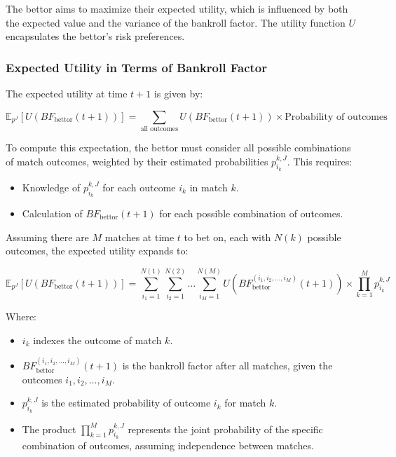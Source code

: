 The bettor aims to maximize their expected utility, which is influenced by both the expected value and the variance of the bankroll factor. The utility function \( U \) encapsulates the bettor's risk preferences.

\subsubsection{Expected Utility in Terms of Bankroll Factor}

The expected utility at time \( t+1 \) is given by:

\[
\mathbb{E}_{p^{J}}\left[ U\left( BF_{\text{bettor}}(t+1) \right) \right] = \sum_{\text{all outcomes}} U\left( BF_{\text{bettor}}(t+1) \right) \times \text{Probability of outcomes}
\]

To compute this expectation, the bettor must consider all possible combinations of match outcomes, weighted by their estimated probabilities \( p_{i_k}^{k,J} \). This requires:

\begin{itemize}
    \item Knowledge of \( p_{i_k}^{k,J} \) for each outcome \( i_k \) in match \( k \).
    \item Calculation of \( BF_{\text{bettor}}(t+1) \) for each possible combination of outcomes.
\end{itemize}

Assuming there are \( M \) matches at time \(t\) to bet on, each with \( N(k) \) possible outcomes, the expected utility expands to:

\[
\mathbb{E}_{p^{J}}\left[ U\left( BF_{\text{bettor}}(t+1) \right) \right] = \sum_{i_1=1}^{N(1)} \sum_{i_2=1}^{N(2)} \dots \sum_{i_M=1}^{N(M)} U\left( BF_{\text{bettor}}^{(i_1, i_2, \dots, i_M)}(t+1) \right) \times \prod_{k=1}^{M} p_{i_k}^{k,J}
\]

Where:

\begin{itemize}
    \item \( i_k \) indexes the outcome of match \( k \).
    \item \( BF_{\text{bettor}}^{(i_1, i_2, \dots, i_M)}(t+1) \) is the bankroll factor after all matches, given the outcomes \( i_1, i_2, \dots, i_M \).
    \item \( p_{i_k}^{k,J} \) is the estimated probability of outcome \( i_k \) for match \( k \).
    \item The product \( \prod_{k=1}^{M} p_{i_k}^{k,J} \) represents the joint probability of the specific combination of outcomes, assuming independence between matches.
\end{itemize}

